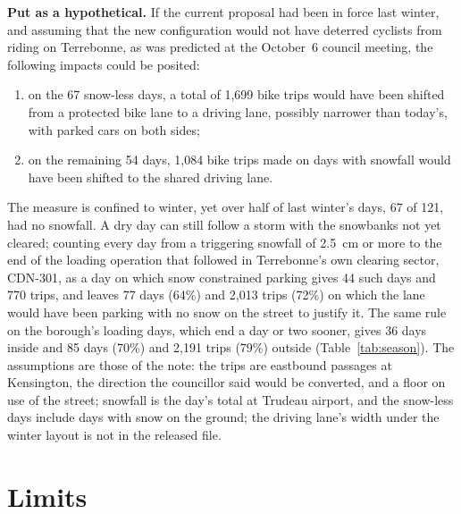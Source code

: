 \documentclass[11pt,letterpaper]{article}
\begin{document}
\textbf{Put as a hypothetical.} If the current proposal had been in force
last winter, and assuming that the new configuration would not have
deterred cyclists from riding on Terrebonne, as was predicted at the
October~6 council meeting, the following impacts could be posited:
\begin{enumerate}[nosep]
  \item on the 67 snow-less days, a total of 1{,}699 bike trips would have
    been shifted from a protected bike lane to a driving lane, possibly
    narrower than today's, with parked cars on both sides;
  \item on the remaining 54 days, 1{,}084 bike trips made on days with
    snowfall would have been shifted to the shared driving lane.
\end{enumerate}
The measure is confined to winter, yet over half of last winter's days, 67
of 121, had no snowfall. A dry day can still follow a storm with the
snowbanks not yet cleared; counting every day from a triggering snowfall of
2.5~cm or more to the end of the loading operation that followed in
Terrebonne's own clearing sector, CDN-301, as a day on which snow
constrained parking gives 44 such days and 770 trips, and leaves 77 days
(64\%) and 2{,}013 trips (72\%) on which the lane would have been parking
with no snow on the street to justify it. The same rule on the borough's
loading days, which end a day or two sooner, gives 36 days inside and 85
days (70\%) and 2{,}191 trips (79\%) outside (Table~\ref{tab:season}).
The assumptions are those of the note: the trips are eastbound passages at
Kensington, the direction the councillor said would be converted, and a
floor on use of the street; snowfall is the day's total at Trudeau
airport, and the snow-less days include days with snow on the ground; the
driving lane's width under the winter layout is not in the released file.

\section{Limits}
\end{document}
